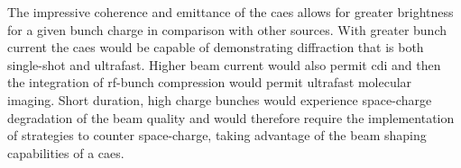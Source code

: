 The impressive coherence and emittance of the \gls{caes} allows for greater brightness for a given bunch charge in comparison with other sources.
With greater bunch current the \gls{caes} would be capable of demonstrating diffraction that is both single-shot and ultrafast.
Higher beam current would also permit \gls{cdi} and then the integration of rf-bunch compression would permit ultrafast molecular imaging.
Short duration, high charge bunches would experience space-charge degradation of the beam quality and would therefore require the implementation of strategies to counter space-charge, taking advantage of the beam shaping capabilities of a \gls{caes}.